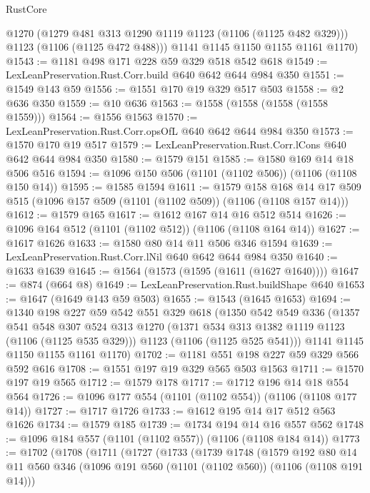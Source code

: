 \begin{lexlean}{RustCore}
\begin{coremodule}
        @1270
        (@1279 @481 @313 @1290 @1119 @1123 (@1106 (@1125 @482 @329)))
        @1123
        (@1106 (@1125 @472 @488)))
      @1141
      @1145
      @1150
      @1155
      @1161
      @1170)
@1543 := @1181 @498 @171 @228 @59 @329 @518 @542 @618
@1549 := LexLeanPreservation.Rust.Corr.build @640 @642 @644 @984 @350
@1551 := @1549 @143 @59
@1556 := @1551 @170 @19 @329 @517 @503
@1558 := @2 @636 @350
@1559 := @10 @636
@1563 := @1558 (@1558 (@1558 (@1558 @1559)))
@1564 := @1556 @1563
@1570 := LexLeanPreservation.Rust.Corr.opsOfL @640 @642 @644 @984 @350
@1573 := @1570 @170 @19 @517
@1579 := LexLeanPreservation.Rust.Corr.lCons @640 @642 @644 @984 @350
@1580 := @1579 @151
@1585 := @1580 @169 @14 @18 @506 @516
@1594 := @1096 @150 @506 (@1101 (@1102 @506)) (@1106 (@1108 @150 @14))
@1595 := @1585 @1594
@1611 := @1579
    @158
    @168
    @14
    @17
    @509
    @515
    (@1096 @157 @509 (@1101 (@1102 @509)) (@1106 (@1108 @157 @14)))
@1612 := @1579 @165
@1617 := @1612 @167 @14 @16 @512 @514
@1626 := @1096 @164 @512 (@1101 (@1102 @512)) (@1106 (@1108 @164 @14))
@1627 := @1617 @1626
@1633 := @1580 @80 @14 @11 @506 @346 @1594
@1639 := LexLeanPreservation.Rust.Corr.lNil @640 @642 @644 @984 @350
@1640 := @1633 @1639
@1645 := @1564 (@1573 (@1595 (@1611 (@1627 @1640))))
@1647 := @874 (@664 @8)
@1649 := LexLeanPreservation.Rust.buildShape @640
@1653 := @1647 (@1649 @143 @59 @503)
@1655 := @1543 (@1645 @1653)
@1694 := @1340
    @198
    @227
    @59
    @542
    @551
    @329
    @618
    (@1350
      @542
      @549
      @336
      (@1357
        @541
        @548
        @307
        @524
        @313
        @1270
        (@1371 @534 @313 @1382 @1119 @1123 (@1106 (@1125 @535 @329)))
        @1123
        (@1106 (@1125 @525 @541)))
      @1141
      @1145
      @1150
      @1155
      @1161
      @1170)
@1702 := @1181 @551 @198 @227 @59 @329 @566 @592 @616
@1708 := @1551 @197 @19 @329 @565 @503 @1563
@1711 := @1570 @197 @19 @565
@1712 := @1579 @178
@1717 := @1712 @196 @14 @18 @554 @564
@1726 := @1096 @177 @554 (@1101 (@1102 @554)) (@1106 (@1108 @177 @14))
@1727 := @1717 @1726
@1733 := @1612 @195 @14 @17 @512 @563 @1626
@1734 := @1579 @185
@1739 := @1734 @194 @14 @16 @557 @562
@1748 := @1096 @184 @557 (@1101 (@1102 @557)) (@1106 (@1108 @184 @14))
@1773 := @1702
    (@1708
      (@1711
        (@1727
          (@1733
            (@1739
              @1748
              (@1579
                @192
                @80
                @14
                @11
                @560
                @346
                (@1096 @191 @560 (@1101 (@1102 @560)) (@1106 (@1108 @191 @14)))

\end{coremodule}
\end{lexlean}
